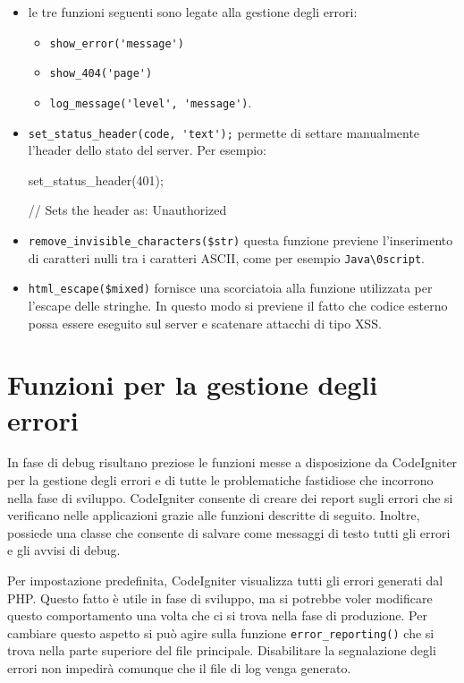 \begin{itemize}
\item le tre funzioni seguenti sono legate alla gestione degli errori: 
\begin{itemize}
\item \verb|show_error('message')|
\item \verb|show_404('page')|
\item \verb|log_message('level', 'message')|.
\end{itemize}

\item \verb|set_status_header(code, 'text');| permette di settare manualmente l'header dello stato del server. Per esempio:

\begin{code}
set_status_header(401);

// Sets the header as: Unauthorized
\end{code}

\item \verb|remove_invisible_characters($str)| questa funzione previene l'inserimento di caratteri nulli tra i caratteri ASCII, come per esempio \verb|Java\0script|.

\item \verb|html_escape($mixed)| fornisce una scorciatoia alla funzione  utilizzata per l'escape delle stringhe. In questo modo si previene il fatto che codice esterno possa essere eseguito sul server e scatenare attacchi di tipo \ac{XSS}.
\end{itemize}

\section*{Funzioni per la gestione degli errori}
In fase di debug risultano preziose le funzioni messe a disposizione da CodeIgniter per la gestione degli errori e di tutte le problematiche fastidiose che incorrono nella fase di sviluppo. CodeIgniter consente di creare dei report sugli errori che si verificano nelle applicazioni grazie alle funzioni descritte di seguito. Inoltre, possiede una classe che consente di salvare come messaggi di testo tutti gli errori e gli avvisi di debug.

Per impostazione predefinita, CodeIgniter visualizza tutti gli errori generati dal \ac{PHP}. Questo fatto è utile in fase di sviluppo, ma si potrebbe voler modificare questo comportamento una volta che ci si trova nella fase di produzione. Per cambiare questo aspetto si può agire sulla funzione \verb|error_reporting()| che si trova nella parte superiore del file  principale. Disabilitare la segnalazione degli errori non impedirà comunque che il file di log venga generato. 

